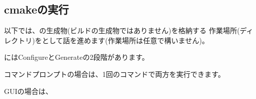 \subsection{cmakeの実行}
\label{subsec:CmakeLibrary}

\noindent
以下では、\cmake の生成物(ビルドの生成物ではありません)を格納する
作業場所(ディレクトリ)を\build として話を進めます(作業場所は任意で構いません)。

\medskip
\noindent
\cmake にはConfigureとGenerateの2段階があります。

\medskip
\noindent
コマンドプロンプトの場合は、1回のコマンドで両方を実行できます。
\begin{narrow}[15pt]
\end{narrow}
\medskip
\noindent
GUIの場合は、
